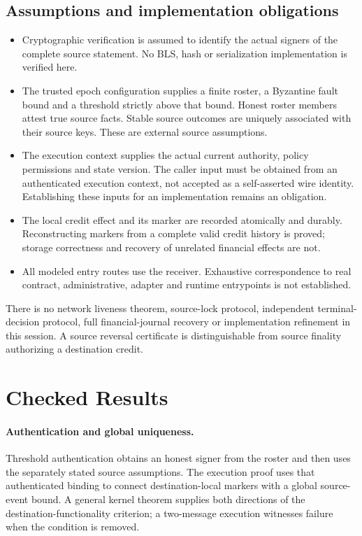 \documentclass[11pt,a4paper]{article}
\begin{document}
\subsection{Assumptions and implementation obligations}

\begin{itemize}
\item Cryptographic verification is assumed to identify the actual signers of
the complete source statement. No BLS, hash or serialization implementation is
verified here.
\item The trusted epoch configuration supplies a finite roster, a Byzantine
fault bound and a threshold strictly above that bound. Honest roster members
attest true source facts. Stable source outcomes are uniquely associated with
their source keys. These are external source assumptions.
\item The execution context supplies the actual current authority, policy
permissions and state version. The caller input must be obtained from an
authenticated execution context, not accepted as a self-asserted wire identity.
Establishing these inputs for an implementation remains an obligation.
\item The local credit effect and its marker are recorded atomically and
durably. Reconstructing markers from a complete valid credit history is proved;
storage correctness and recovery of unrelated financial effects are not.
\item All modeled entry routes use the receiver. Exhaustive correspondence to
real contract, administrative, adapter and runtime entrypoints is not established.
\end{itemize}

There is no network liveness theorem, source-lock protocol, independent
terminal-decision protocol, full financial-journal recovery or implementation
refinement in this session. A source reversal certificate is distinguishable
from source finality authorizing a destination credit.

\section{Checked Results}

\paragraph{Authentication and global uniqueness.}
Threshold authentication obtains an honest signer from the roster and then
uses the separately stated source assumptions. The execution proof uses that
authenticated binding to connect destination-local markers with a global
source-event bound. A general kernel theorem supplies both directions of the
destination-functionality criterion; a two-message execution witnesses failure
when the condition is removed.
\end{document}
